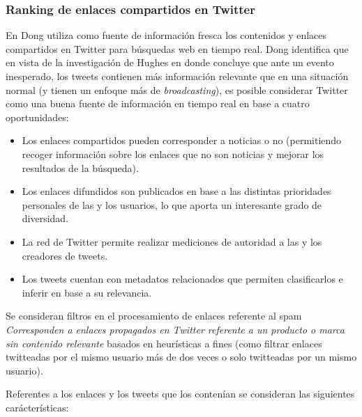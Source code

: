  \subsubsection{Ranking de enlaces compartidos en Twitter}
  
  En \cite{Dong:2010:TEI:1772690.1772725} Dong utiliza como fuente de información fresca los contenidos y enlaces compartidos en Twitter para búsquedas web en tiempo real. Dong identifica que en vista de la investigación de  Hughes en \cite{hughes2009twitter} donde concluye que ante un evento inesperado, los tweets contienen más información relevante que en una situación normal (y tienen un enfoque más de \emph{broadcasting}), es posible considerar Twitter como una buena fuente de información en tiempo real en base a cuatro oportunidades:
  
  \begin{itemize}
	\item Los enlaces compartidos pueden corresponder a noticias o no (permitiendo recoger información sobre los enlaces que no son noticias y mejorar los resultados de la búsqueda).
	\item Los enlaces difundidos son publicados en base a las distintas prioridades personales de las y los usuarios, lo que aporta un interesante grado de diversidad.
	\item La red de Twitter permite realizar mediciones de autoridad a las y los creadores de tweets.
	\item Los tweets cuentan con metadatos relacionados que permiten clasificarlos e inferir en base a su relevancia.
  \end{itemize}
  
 Se consideran filtros en el procesamiento de enlaces referente al spam \emph{ Corresponden a enlaces propagados en Twitter referente a un producto o marca sin contenido relevante} basados en heurísticas a fines (como filtrar enlaces twitteadas por el mismo usuario más de dos veces o solo twitteadas por un mismo usuario).
 
 Referentes a los enlaces y los tweets que los contenían se consideran las siguientes carácterísticas:
  
